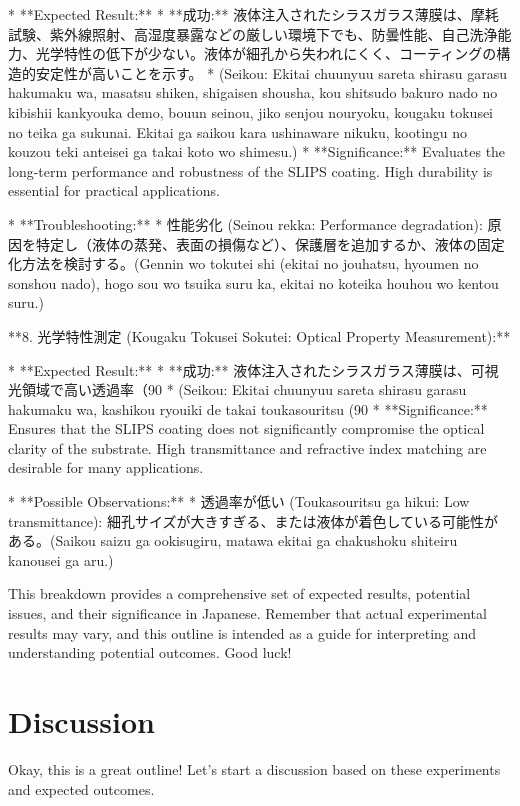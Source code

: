 \documentclass{article}
\begin{document}
*   **Expected Result:**
    *   **成功:** 液体注入されたシラスガラス薄膜は、摩耗試験、紫外線照射、高湿度暴露などの厳しい環境下でも、防曇性能、自己洗浄能力、光学特性の低下が少ない。液体が細孔から失われにくく、コーティングの構造的安定性が高いことを示す。
    *   (Seikou: Ekitai chuunyuu sareta shirasu garasu hakumaku wa, masatsu shiken, shigaisen shousha, kou shitsudo bakuro nado no kibishii kankyouka demo, bouun seinou, jiko senjou nouryoku, kougaku tokusei no teika ga sukunai. Ekitai ga saikou kara ushinaware nikuku, kootingu no kouzou teki anteisei ga takai koto wo shimesu.)
    *   **Significance:**  Evaluates the long-term performance and robustness of the SLIPS coating.  High durability is essential for practical applications.

*   **Troubleshooting:**
    *   性能劣化 (Seinou rekka: Performance degradation): 原因を特定し（液体の蒸発、表面の損傷など）、保護層を追加するか、液体の固定化方法を検討する。(Gennin wo tokutei shi (ekitai no jouhatsu, hyoumen no sonshou nado), hogo sou wo tsuika suru ka, ekitai no koteika houhou wo kentou suru.)

**8. 光学特性測定 (Kougaku Tokusei Sokutei: Optical Property Measurement):**

*   **Expected Result:**
    *   **成功:** 液体注入されたシラスガラス薄膜は、可視光領域で高い透過率（90%
    *   (Seikou: Ekitai chuunyuu sareta shirasu garasu hakumaku wa, kashikou ryouiki de takai toukasouritsu (90%
    *   **Significance:**  Ensures that the SLIPS coating does not significantly compromise the optical clarity of the substrate. High transmittance and refractive index matching are desirable for many applications.

*   **Possible Observations:**
    *   透過率が低い (Toukasouritsu ga hikui: Low transmittance): 細孔サイズが大きすぎる、または液体が着色している可能性がある。(Saikou saizu ga ookisugiru, matawa ekitai ga chakushoku shiteiru kanousei ga aru.)

This breakdown provides a comprehensive set of expected results, potential issues, and their significance in Japanese. Remember that actual experimental results may vary, and this outline is intended as a guide for interpreting and understanding potential outcomes. Good luck!


\section{Discussion}
Okay, this is a great outline! Let's start a discussion based on these experiments and expected outcomes.
\end{document}
